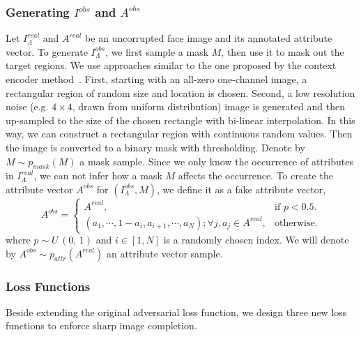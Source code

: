 \documentclass[acmtog,timestamp]{acmart}
\begin{document}
\subsubsection{Generating $I^{obs}$ and $A^{obs}$} Let $I^{real}_{\Lambda}$ and $A^{real}$ be an uncorrupted face image and its annotated attribute vector. To generate $I^{obs}_{\Lambda}$, we first sample a mask $M$, then use it to mask out the target regions. We use approaches similar to the one proposed by the context encoder method~\cite{pathak2016context}. First, starting with an all-zero one-channel image, a rectangular region of random size and location is chosen. Second, a low resolution noise (e.g. $4\times4$, drawn from uniform distribution) image is generated and then up-sampled to the size of the chosen rectangle with bi-linear interpolation. In this way, we can construct a rectangular region with continuous random values. Then the image is converted to a binary mask with thresholding.
Denote by $M\sim p_{mask}(M)$ a mask sample. Since we only know the occurrence of attributes in $I^{real}_{\Lambda}$, we can not infer how a mask $M$ affects the occurrence. To create the attribute vector $A^{obs}$ for $(I^{obs}_{\Lambda}, M)$, we define it as a fake attribute vector, 
\begin{equation}
	A^{obs}=\begin{cases}
    A^{real}, & \text{if $p<0.5$}.\\
    (a_1, \cdots, 1-a_i, a_{i+1}, \cdots, a_N); \forall j, a_j\in A^{real}, & \text{otherwise}.
    \end{cases}
\end{equation}
where $p\sim \textit{U}\,(0,\, 1)$ and $i \in [1, N]$ is a randomly chosen index. We will denote by $A^{obs}\sim p_{attr}(A^{real})$ an attribute vector sample. 

\subsubsection{Loss Functions} 
Beside extending the original adversarial loss function, we design three  new loss functions to enforce sharp image completion.
\end{document}
